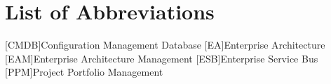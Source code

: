 
\chapter*{List of Abbreviations}

\begin{acronym}[ewuifbwejkbfjksbjkcbsdjcjkn3j]%
[CMDB]{Configuration Management Database}
[EA]{Enterprise Architecture}
[EAM]{Enterprise Architecture Management}
[ESB]{Enterprise Service Bus}
[PPM]{Project Portfolio Management}


\end{acronym}